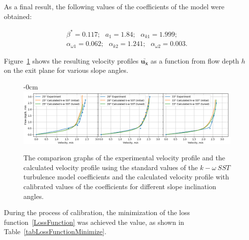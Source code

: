 \documentclass[mathematics,article,submit,pdftex,moreauthors]{Definitions/mdpi}
\begin{document}
As a final result, the following values of the coefficients of the model were obtained:

\begin{linenomath}
\begin{equation}
	\begin{aligned}
		\beta^* = 0.117;\ \ \ a_1 = 1.84;\ \ \ \alpha_{k 1} = 1.999;\\
		\alpha_{\omega 1} = 0.062; \ \ \ \alpha_{k 2} = 1.241;\ \ \ \alpha_{\omega 2} = 0.003.
	\end{aligned}
\end{equation}
\end{linenomath}

Figure~\ref{NIIMexUProfilesKWSSTGlob} shows the resulting velocity profiles $\bar{\boldsymbol{u_x}}$ as a function from flow depth $h$ on the exit plane for various slope angles.

\begin{figure}[H]
\begin{adjustwidth}{-\extralength}{0cm}
\centering
\includegraphics[width=18 cm]{UProfilesKWSSTGlob1.png}
\end{adjustwidth}
\caption{The comparison graphs of the experimental velocity profile and the calculated velocity profile using the standard values of the $k-\omega\ SST$ turbulence model coefficients and the calculated velocity profile with calibrated values of the coefficients for different slope inclination angles.\label{NIIMexUProfilesKWSSTGlob}}
\end{figure}  

During the process of calibration, the minimization of the loss function~\eqref{LossFunction} was achieved the value, as shown in Table~\ref{tabLossFunctionMinimize}.
\end{document}
